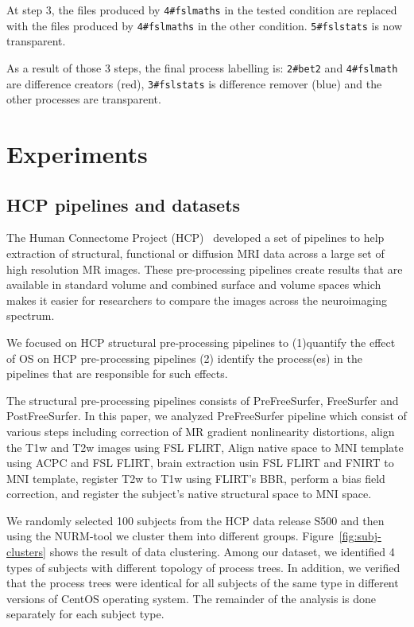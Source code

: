 \documentclass[a4paper,num-refs]{oup-contemporary}
\begin{document}
At step 3, the files produced by \texttt{4\#fslmaths} in the tested 
condition are replaced with the files produced by \texttt{4\#fslmaths} 
in the other condition. \texttt{5\#fslstats} is now transparent.
 
As a result of those 3 steps, the final process labelling is: 
\texttt{2\#bet2} and \texttt{4\#fslmath} are difference creators (red), 
\texttt{3\#fslstats} is difference remover (blue) and the other processes 
are transparent.


\section{Experiments}

\subsection{HCP pipelines and datasets}

The Human Connectome Project (HCP)~\cite{glasser2013minimal} developed 
a set of pipelines to help extraction of structural, functional or 
diffusion MRI data across a large set of high resolution MR images. 
These pre-processing pipelines create results that are available in 
standard volume and combined surface and volume spaces which makes it 
easier for researchers to compare the images across the neuroimaging 
spectrum. 

We focused on HCP structural pre-processing pipelines to (1)quantify 
the effect of OS on HCP pre-processing pipelines (2) identify the 
process(es) in the pipelines that are responsible for such effects.

The structural pre-processing pipelines consists of PreFreeSurfer, 
FreeSurfer and PostFreeSurfer. In this paper, 
we analyzed PreFreeSurfer pipeline which consist of various steps 
including correction of MR 
gradient nonlinearity distortions, align the T1w and T2w images using 
FSL FLIRT, Align native space to MNI template using ACPC and FSL FLIRT, 
brain extraction usin FSL FLIRT and FNIRT to MNI template, register T2w 
to T1w using FLIRT's BBR, perform a bias field correction, and register 
the subject's native structural space to MNI space.  

We randomly selected 100 subjects from the HCP data release S500 and then 
using the NURM-tool we cluster them into different groups. 
Figure~\ref{fig:subj-clusters} shows the result of data clustering. 
Among our dataset, we identified 4 types of subjects with 
different topology of process trees. In addition, we verified that 
the process trees were identical for all subjects of the same type in 
different versions of CentOS operating system. The remainder of the 
analysis is done separately for each subject type.
\end{document}
